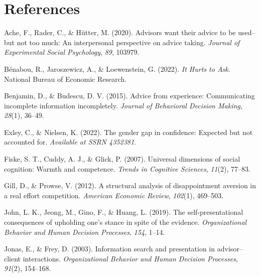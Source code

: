 \documentclass[
  man,floatsintext]{apa6}
\newlength{\cslhangindent}
\newlength{\cslentryspacingunit} %
\newenvironment{CSLReferences}[2] %
 {%
  \setlength{\parindent}{0pt}
  \ifodd #1
  \let\oldpar\par
  \def\par{\hangindent=\cslhangindent\oldpar}
  \fi
  \setlength{\parskip}{#2\cslentryspacingunit}
 }%
 {}
\begin{document}
\hypertarget{references}{%
\section{References}\label{references}}

\begingroup
\singlespacing
\setlength{\parindent}{-0.2in}
\setlength{\leftskip}{0.2in}
\noindent

\hypertarget{refs}{}
\begin{CSLReferences}{1}{0}
\leavevmode{}%
Ache, F., Rader, C., \& Hütter, M. (2020). Advisors want their advice to be used--but not too much: {An} interpersonal perspective on advice taking. \emph{Journal of Experimental Social Psychology}, \emph{89}, 103979.

\leavevmode{}%
Bénabou, R., Jaroszewicz, A., \& Loewenstein, G. (2022). \emph{It {Hurts} to {Ask}}. National Bureau of Economic Research.

\leavevmode{}%
Benjamin, D., \& Budescu, D. V. (2015). Advice from experience: {Communicating} incomplete information incompletely. \emph{Journal of Behavioral Decision Making}, \emph{28}(1), 36--49.

\leavevmode{}%
Exley, C., \& Nielsen, K. (2022). The gender gap in confidence: {Expected} but not accounted for. \emph{Available at SSRN 4352381}.

\leavevmode{}%
Fiske, S. T., Cuddy, A. J., \& Glick, P. (2007). Universal dimensions of social cognition: Warmth and competence. \emph{Trends in Cognitive Sciences}, \emph{11}(2), 77--83.

\leavevmode{}%
Gill, D., \& Prowse, V. (2012). A structural analysis of disappointment aversion in a real effort competition. \emph{American Economic Review}, \emph{102}(1), 469--503.

\leavevmode{}%
John, L. K., Jeong, M., Gino, F., \& Huang, L. (2019). The self-presentational consequences of upholding one's stance in spite of the evidence. \emph{Organizational Behavior and Human Decision Processes}, \emph{154}, 1--14.

\leavevmode{}%
Jonas, E., \& Frey, D. (2003). Information search and presentation in advisor--client interactions. \emph{Organizational Behavior and Human Decision Processes}, \emph{91}(2), 154--168.


\end{CSLReferences}
\end{document}
